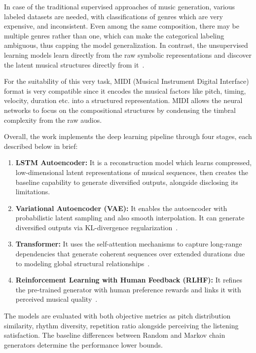 \documentclass[conference]{IEEEtran}
\begin{document}
In case of the traditional supervised approaches of music generation, various labeled datasets are needed, with classifications of genres which are very expensive, and inconsistent. Even among the same composition, there may be multiple genres rather than one, which can make the categorical labeling ambiguous, thus capping the model generalization. In contrast, the unsupervised learning models learn directly from the raw symbolic representations and discover the latent musical structures directly from it~\cite{ref2}.

For the suitability of this very task, MIDI (Musical Instrument Digital Interface) format is very compatible since it encodes the musical factors like pitch, timing, velocity, duration etc. into a structured representation. MIDI allows the neural networks to focus on the compositional structures by condensing the timbral complexity from the raw audios.

Overall, the work implements the deep learning pipeline through four stages, each described below in brief:

\begin{enumerate}
    \item \textbf{LSTM Autoencoder:} It is a reconstruction model which learns compressed, low-dimensional latent representations of musical sequences, then creates the baseline capability to generate diversified outputs, alongside disclosing its limitations.
    \item \textbf{Variational Autoencoder (VAE):} It enables the autoencoder with probabilistic latent sampling and also smooth interpolation. It can generate diversified outputs via KL-divergence regularization~\cite{ref3}.
    \item \textbf{Transformer:} It uses the self-attention mechanisms to capture long-range dependencies that generate coherent sequences over extended durations due to modeling global structural relationships~\cite{ref4}.
    \item \textbf{Reinforcement Learning with Human Feedback (RLHF):} It refines the pre-trained generator with human preference rewards and links it with perceived musical quality~\cite{ref5}.
\end{enumerate}

The models are evaluated with both objective metrics as pitch distribution similarity, rhythm diversity, repetition ratio alongside perceiving the listening satisfaction. The baseline differences between Random and Markov chain generators determine the performance lower bounds.
\end{document}
